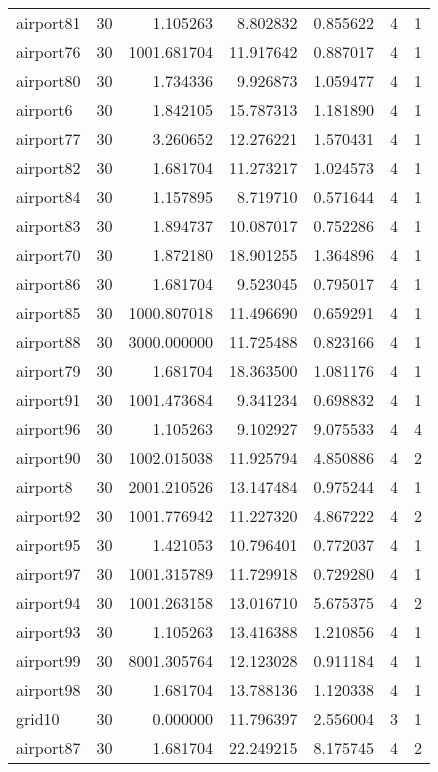 \begin{longtable}{|l|r|r|r|r|r|r|}
airport81 & 30 & 1.105263 & 8.802832 & 0.855622 & 4 & 1 \\
airport76 & 30 & 1001.681704 & 11.917642 & 0.887017 & 4 & 1 \\
airport80 & 30 & 1.734336 & 9.926873 & 1.059477 & 4 & 1 \\
airport6 & 30 & 1.842105 & 15.787313 & 1.181890 & 4 & 1 \\
airport77 & 30 & 3.260652 & 12.276221 & 1.570431 & 4 & 1 \\
airport82 & 30 & 1.681704 & 11.273217 & 1.024573 & 4 & 1 \\
airport84 & 30 & 1.157895 & 8.719710 & 0.571644 & 4 & 1 \\
airport83 & 30 & 1.894737 & 10.087017 & 0.752286 & 4 & 1 \\
airport70 & 30 & 1.872180 & 18.901255 & 1.364896 & 4 & 1 \\
airport86 & 30 & 1.681704 & 9.523045 & 0.795017 & 4 & 1 \\
airport85 & 30 & 1000.807018 & 11.496690 & 0.659291 & 4 & 1 \\
airport88 & 30 & 3000.000000 & 11.725488 & 0.823166 & 4 & 1 \\
airport79 & 30 & 1.681704 & 18.363500 & 1.081176 & 4 & 1 \\
airport91 & 30 & 1001.473684 & 9.341234 & 0.698832 & 4 & 1 \\
airport96 & 30 & 1.105263 & 9.102927 & 9.075533 & 4 & 4 \\
airport90 & 30 & 1002.015038 & 11.925794 & 4.850886 & 4 & 2 \\
airport8 & 30 & 2001.210526 & 13.147484 & 0.975244 & 4 & 1 \\
airport92 & 30 & 1001.776942 & 11.227320 & 4.867222 & 4 & 2 \\
airport95 & 30 & 1.421053 & 10.796401 & 0.772037 & 4 & 1 \\
airport97 & 30 & 1001.315789 & 11.729918 & 0.729280 & 4 & 1 \\
airport94 & 30 & 1001.263158 & 13.016710 & 5.675375 & 4 & 2 \\
airport93 & 30 & 1.105263 & 13.416388 & 1.210856 & 4 & 1 \\
airport99 & 30 & 8001.305764 & 12.123028 & 0.911184 & 4 & 1 \\
airport98 & 30 & 1.681704 & 13.788136 & 1.120338 & 4 & 1 \\
grid10 & 30 & 0.000000 & 11.796397 & 2.556004 & 3 & 1 \\
airport87 & 30 & 1.681704 & 22.249215 & 8.175745 & 4 & 2 \\

\end{longtable}
